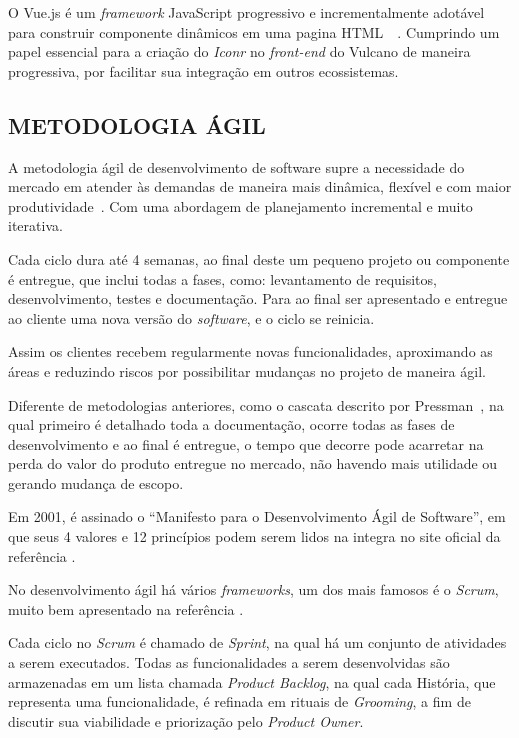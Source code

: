 \documentclass[
  12pt,            %
  openany,
  oneside,
  a4paper,         %
  english,      %
  brazil
]{article}
\numberwithin{figure}{section}
\numberwithin{table}{section}
\newcounter{subsubsubsection}[subsubsection]
\begin{document}
O Vue.js é um \textit{framework} JavaScript progressivo e incrementalmente adotável para construir componente dinâmicos em uma pagina HTML~\cite{vue_complete_guide}~\cite{vuejs_oreilly}. Cumprindo um papel essencial para a criação do \textit{Iconr} no \textit{front-end} do Vulcano de maneira progressiva, por facilitar sua integração em outros ecossistemas.


\subsection{METODOLOGIA ÁGIL}
A metodologia ágil de desenvolvimento de software supre a necessidade do mercado em atender às demandas de maneira mais dinâmica, flexível e com maior produtividade~\cite{sutherland2016scrum}\cite{scrum_guide}. Com uma abordagem de planejamento incremental e muito iterativa.

Cada ciclo dura até 4 semanas, ao final deste um pequeno projeto ou componente é entregue, que inclui todas a fases, como: levantamento de requisitos, desenvolvimento, testes e documentação. Para ao final ser apresentado e entregue ao cliente uma nova versão do \textit{software}, e o ciclo se reinicia.

Assim os clientes recebem regularmente novas funcionalidades, aproximando as áreas e reduzindo riscos por possibilitar mudanças no projeto de maneira ágil.

Diferente de metodologias anteriores, como o cascata descrito por Pressman~\cite{pressman}, na qual primeiro é detalhado toda a documentação, ocorre todas as fases de desenvolvimento e ao final é entregue, o tempo que decorre pode acarretar na perda do valor do produto entregue no mercado, não havendo mais utilidade ou gerando mudança de escopo.

Em 2001, é assinado o ``Manifesto para o Desenvolvimento Ágil de Software'', em que seus 4 valores e 12 princípios podem serem lidos na integra no site oficial da referência \cite{manifesto_agil}.

No desenvolvimento ágil há vários \textit{frameworks}, um dos mais famosos é o \textit{Scrum}, muito bem apresentado na referência \cite{sutherland2016scrum}.

Cada ciclo no \textit{Scrum} é chamado de \textit{Sprint}, na qual há um conjunto de atividades a serem executados. Todas as funcionalidades a serem desenvolvidas são armazenadas em um lista chamada \textit{Product Backlog}, na qual cada História, que representa uma funcionalidade, é refinada em rituais de \textit{Grooming}, a fim de discutir sua viabilidade e priorização pelo \textit{Product Owner}.
\end{document}
